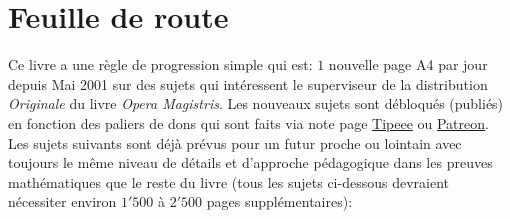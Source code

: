 	\begin{center}
	\end{center}
	
	\newpage
	\thispagestyle{empty}
	\mbox{}
	\section{Feuille de route}
	Ce livre a une règle de progression simple qui est: $1$ nouvelle page A4 par jour depuis Mai 2001 sur des sujets qui intéressent le superviseur de la distribution \textit{Originale} du livre \textit{Opera Magistris}. Les nouveaux sujets sont débloqués (publiés) en fonction des paliers de dons qui sont faits via note page \href{https://www.tipeee.com/elements-of-applied-mathematics}{Tipeee} ou \href{https://www.patreon.com/sciences}{Patreon}. Les sujets suivants sont déjà prévus pour un futur proche ou lointain avec toujours le même niveau de détails et d'approche pédagogique dans les preuves mathématiques que le reste du livre (tous les sujets ci-dessous devraient nécessiter environ $1'500$ à $2'500$ pages supplémentaires):

